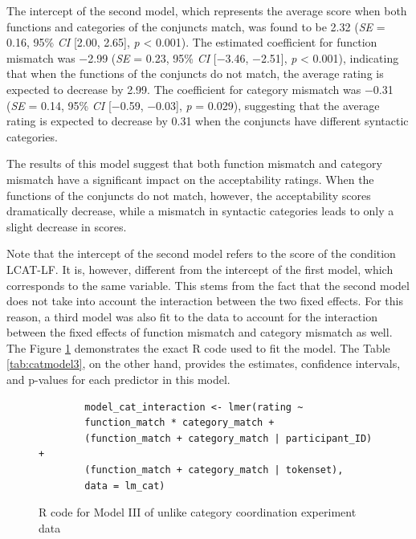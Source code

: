 The intercept of the second model, which represents the average score when both functions and categories of the conjuncts match, was found to be 2.32 (\textit{SE} = 0.16, 95\% \textit{CI} [2.00, 2.65], \textit{p} < 0.001). The estimated coefficient for function mismatch was $-$2.99 (\textit{SE} = 0.23, 95\% \textit{CI} [$-$3.46, $-$2.51], \textit{p} < 0.001), indicating that when the functions of the conjuncts do not match, the average rating is expected to decrease by 2.99. The coefficient for category mismatch was $-$0.31 (\textit{SE} = 0.14, 95\% \textit{CI} [$-$0.59, $-$0.03], \textit{p} = 0.029), suggesting that the average rating is expected to decrease by 0.31 when the conjuncts have different syntactic categories.

The results of this model suggest that both function mismatch and category mismatch have a significant impact on the acceptability ratings. When the functions of the conjuncts do not match, however, the acceptability scores dramatically decrease, while a mismatch in syntactic categories leads to only a slight decrease in scores.

Note that the intercept of the second model refers to the score of the condition LCAT-LF. It is, however, different from the intercept of the first model, which corresponds to the same variable. This stems from the fact that the second model does not take into account the interaction between the two fixed effects. For this reason, a third model was also fit to the data to account for the interaction between the fixed effects of function mismatch and category mismatch as well. The Figure \ref{fig:R_catmodel2} demonstrates the exact R code used to fit the model. The Table \ref{tab:catmodel3}, on the other hand, provides the estimates, confidence intervals, and p-values for each predictor in this model. 


\begin{figure}[!h]
	\lstset{
		language=R,
		escapechar=@,
		basicstyle=\small\ttfamily,
		columns=fullflexible,
		keepspaces=true
	}
	\begin{lstlisting}
		model_cat_interaction <- lmer(rating ~ 
		function_match * category_match +
		(function_match + category_match | participant_ID) +
		(function_match + category_match | tokenset),
		data = lm_cat)\end{lstlisting}
	\caption{R code for Model III of unlike category coordination experiment data}
	\label{fig:R_catmodel2}
\end{figure}


